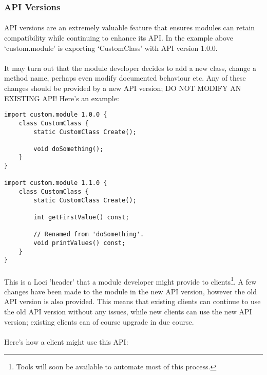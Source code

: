\documentclass[12pt,twoside,notitlepage]{report}
\begin{document}
\subsubsection{API Versions}

\paragraph{}
API versions are an extremely valuable feature that ensures modules can retain compatibility while continuing to enhance its API. In the example above `custom.module' is exporting `CustomClass' with API version 1.0.0.

\paragraph{}
It may turn out that the module developer decides to add a new class, change a method name, perhaps even modify documented behaviour etc. Any of these changes should be provided by a new API version; DO NOT MODIFY AN EXISTING API! Here's an example:

\begin{lstlisting}
import custom.module 1.0.0 {
	class CustomClass {
		static CustomClass Create();
		
		void doSomething();
	}
}

import custom.module 1.1.0 {
	class CustomClass {
		static CustomClass Create();
		
		int getFirstValue() const;
		
		// Renamed from 'doSomething'.
		void printValues() const;
	}
}
\end{lstlisting}

\paragraph{}
This is a Loci 'header' that a module developer might provide to clients\footnote{Tools will soon be available to automate most of this process.}. A few changes have been made to the module in the new API version, however the old API version is also provided. This means that existing clients can continue to use the old API version without any issues, while new clients can use the new API version; existing clients can of course upgrade in due course.

\paragraph{}
Here's how a client might use this API:
\end{document}
